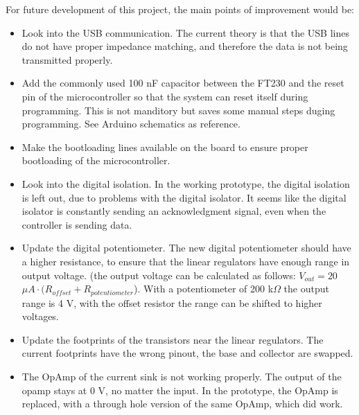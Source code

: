 \IEEEPARstart
{F}{or} future development of this project, the main points of improvement would be:
\begin{itemize}
      \item Look into the USB communication. The current theory is that the USB lines do not have proper impedance matching, and therefore the data is not being transmitted properly.
      \item  Add the commonly used 100 nF capacitor between the FT230 and the reset pin of the microcontroller so that the system can reset itself during programming. This is not manditory but saves some manual steps duging programming. See Arduino schematics as reference.
      \item Make the bootloading lines available on the board to ensure proper bootloading of the microcontroller.
      \item Look into the digital isolation. In the working prototype, the digital isolation is left out, due to problems with the digital isolator. It seems like the digital isolator is constantly sending an acknowledgment signal, even when the controller is sending data.
      \item Update the digital potentiometer. The new digital potentiometer should have a higher resistance, to ensure that the linear regulators have enough range in output voltage. (the output voltage can be calculated as follows: $V_{out} = 20$ $\mu A \cdot (R_{offset}+R_{potentiometer}$). With a potentiometer of 200 k$\Omega$ the output range is 4 V, with the offset resistor the range can be shifted to higher voltages.
      \item Update the footprints of the transistors near the linear regulators. The current footprints have the wrong pinout, the base and collector are swapped.
      \item The OpAmp of the current sink is not working properly. The output of the opamp stays at 0 V, no matter the input. In the prototype, the OpAmp is replaced, with a through hole version of the same OpAmp, which did work. 
\end{itemize}  